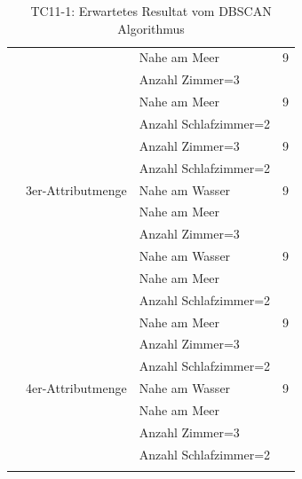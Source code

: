 \begin{longtable}{ | l | l | l | l |}
	& & \tabitem Nahe am Meer & 9 \\
	& & \tabitem Anzahl Zimmer=3 & \\ \cline{3-4} 
	& & \tabitem Nahe am Meer & 9 \\
	& & \tabitem Anzahl Schlafzimmer=2 & \\ \cline{3-4} 

	& & \tabitem Anzahl Zimmer=3 & 9 \\
	& & \tabitem Anzahl Schlafzimmer=2 & \\ \cline{2-4} 

	& 3er-Attributmenge & \tabitem Nahe am Wasser & 9 \\
	& & \tabitem Nahe am Meer & \\ 
	& & \tabitem Anzahl Zimmer=3 & \\ \cline{3-4} 
	& & \tabitem Nahe am Wasser & 9 \\
	& & \tabitem Nahe am Meer & \\ 
	& & \tabitem Anzahl Schlafzimmer=2 & \\ \cline{3-4}
	& & \tabitem Nahe am Meer & 9 \\
	& & \tabitem Anzahl Zimmer=3 & \\ 
	& & \tabitem Anzahl Schlafzimmer=2 & \\ \cline{2-4}

	& 4er-Attributmenge & \tabitem Nahe am Wasser & 9 \\
	& & \tabitem Nahe am Meer & \\ 
	& & \tabitem Anzahl Zimmer=3 & \\ 
	& & \tabitem Anzahl Schlafzimmer=2 & \\ \hline

	\caption{TC11-1: Erwartetes Resultat vom DBSCAN Algorithmus}
	\centering
	\label{fig:recherche:testcases:11:1}
\end{longtable}


